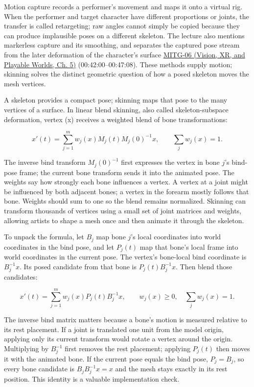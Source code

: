Motion capture records a performer's movement and maps it onto a virtual rig. When the performer and target character have different proportions or joints, the transfer is called retargeting; raw angles cannot simply be copied because they can produce implausible poses on a different skeleton. The lecture also mentions markerless capture and its smoothing, and separates the captured pose stream from the later deformation of the character's surface \href{../07-Vision-XR-and-Playable-Worlds/main.pdf\#nameddest=04-visual-computing-ii-ch036-mitg-06---animation-skinningenveloping}{MITG-06 (Vision, XR, and Playable Worlds, Ch. 5)} (00:42:00--00:47:08). These methods supply motion; skinning solves the distinct geometric question of how a posed skeleton moves the mesh vertices.

A skeleton provides a compact pose; skinning maps that pose to the many vertices of a surface. In linear blend skinning, also called skeleton-subspace deformation, vertex (x) receives a weighted blend of bone transformations:

\[
x'(t)=\sum_{j=1}^{m}w_j(x)M_j(t)M_j(0)^{-1}x,\qquad \sum_j w_j(x)=1.
\]

The inverse bind transform \(M_j(0)^{-1}\) first expresses the vertex in bone \(j\)'s bind-pose frame; the current bone transform sends it into the animated pose. The weights say how strongly each bone influences a vertex. A vertex at a joint might be influenced by both adjacent bones; a vertex in the forearm mostly follows that bone. Weights should sum to one so the blend remains normalized. Skinning can transform thousands of vertices using a small set of joint matrices and weights, allowing artists to shape a mesh once and then animate it through the skeleton.

To unpack the formula, let \(B_j\) map bone \(j\)'s local coordinates into world coordinates in the bind pose, and let \(P_j(t)\) map that bone's local frame into world coordinates in the current pose. The vertex's bone-local bind coordinate is \(B_j^{-1}x\). Its posed candidate from that bone is \(P_j(t)B_j^{-1}x\). Then blend those candidates:

\[
x'(t)=\sum_{j=1}^{m}w_j(x)P_j(t)B_j^{-1}x,\qquad
w_j(x)\ge0,\quad\sum_jw_j(x)=1.
\]

The inverse bind matrix matters because a bone's motion is measured relative to its rest placement. If a joint is translated one unit from the model origin, applying only its current transform would rotate a vertex around the origin. Multiplying by \(B_j^{-1}\) first removes the rest placement; applying \(P_j(t)\) then moves it with the animated bone. If the current pose equals the bind pose, \(P_j=B_j\), so every bone candidate is \(B_jB_j^{-1}x=x\) and the mesh stays exactly in its rest position. This identity is a valuable implementation check.

